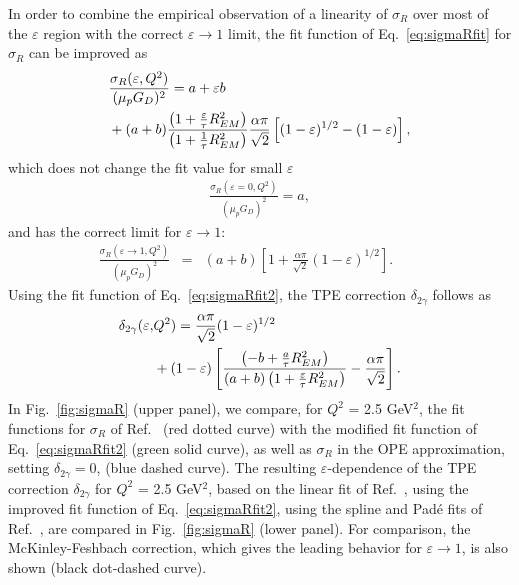In order to combine the empirical observation of a linearity of $\sigma_R$ over most of the $\varepsilon$ region with the correct $\varepsilon \to 1$ limit, the fit function of Eq.~\ref{eq:sigmaRfit} for $\sigma_R$ can be improved as
\begin{align}
&\frac{\sigma_R(\varepsilon, Q^2)}{(\mu_p G_D)^2} = a + \varepsilon b \nonumber \\
&+ (a + b) \frac{ \left(1 + \frac{\varepsilon}{\tau}  R_{EM}^2 \right) }{ \left(1 + \frac{1}{\tau}  R_{EM}^2 \right) } \frac{\alpha \pi}{\sqrt{2}} \left[(1 - \varepsilon)^{1/2} - (1 - \varepsilon)\right],   
\label{eq:sigmaRfit2}
 \end{align}
 which does not change the fit value for small $\varepsilon$
 \begin{eqnarray}
\frac{\sigma_R(\varepsilon = 0, Q^2)}{(\mu_p G_D)^2}  = a, 
\end{eqnarray}
and has the correct limit for $\varepsilon \to 1$:
\begin{eqnarray}
\frac{\sigma_R(\varepsilon \to 1, Q^2)}{(\mu_p G_D)^2} &=& (a + b) \left[ 1 + \frac{\alpha \pi}{\sqrt{2}} (1 - \varepsilon)^{1/2}  \right]. \qquad
 \end{eqnarray}
Using the fit function of Eq.~\ref{eq:sigmaRfit2}, the TPE correction $\delta_{2 \gamma}$ follows as
\begin{align}
\delta_{2 \gamma}(\varepsilon, &Q^2) = \frac{\alpha \pi}{\sqrt{2}} (1 - \varepsilon)^{1/2} \nonumber \\
&+ (1 - \varepsilon) \left[ 
\frac{\left( - b + \frac{a}{\tau} R_{EM}^2 \right) }{(a + b) \left( 1 + \frac{\varepsilon}{\tau} R_{EM}^2 \right)} - \frac{\alpha \pi}{\sqrt{2}}\right] .
\label{eq:delta2gafin}
\end{align}
In Fig.~\ref{fig:sigmaR} (upper panel), we compare, for $Q^2$ = 2.5 GeV$^2$, the fit functions for $\sigma_R$ of Ref.~\cite{Christy:2021snt} (red dotted curve) with the modified fit function of Eq.~\ref{eq:sigmaRfit2} (green solid curve), as well as $\sigma_R$ in the OPE approximation, setting $\delta_{2 \gamma} = 0$, (blue dashed curve).
The resulting $\varepsilon$-dependence of the TPE correction $\delta_{2 \gamma}$ for $Q^2$ = 2.5 GeV$^2$, based on the linear fit of Ref.~\cite{Christy:2021snt}, using the improved fit function of Eq.~\ref{eq:sigmaRfit2}, using the spline and Pad\'e fits of Ref.~\cite{A1:2013fsc}, are compared in Fig.~\ref{fig:sigmaR} (lower panel). For comparison, the McKinley-Feshbach correction, which gives the leading behavior for $\varepsilon \to 1$, is also shown (black dot-dashed curve).  

